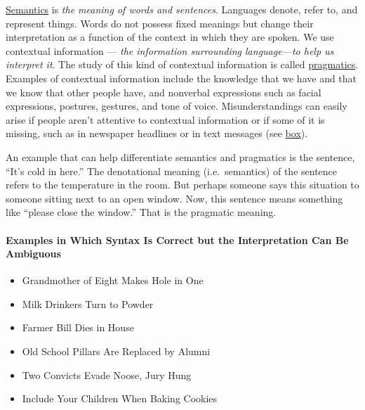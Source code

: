 \documentclass[
]{krantz}
\providecommand{\tightlist}{%
  \setlength{\itemsep}{0pt}\setlength{\parskip}{0pt}}
\begin{document}
\protect\hyperlink{semantics}{Semantics} is \emph{the meaning of words and sentences}. Languages denote, refer to, and represent things. Words do not possess fixed meanings but change their interpretation as a function of the context in which they are spoken. We use contextual information --- \emph{the information surrounding language---to help us interpret it}. The study of this kind of contextual information is called \protect\hyperlink{pragmatics}{pragmatics}. Examples of contextual information include the knowledge that we have and that we know that other people have, and nonverbal expressions such as facial expressions, postures, gestures, and tone of voice. Misunderstandings can easily arise if people aren't attentive to contextual information or if some of it is missing, such as in newspaper headlines or in text messages (see \protect\hyperlink{examples-in-which-syntax-is-correct-but-the-interpretation-can-be-ambiguous}{box}).

An example that can help differentiate semantics and pragmatics is the sentence, ``It's cold in here.'' The denotational meaning (i.e.~semantics) of the sentence refers to the temperature in the room. But perhaps someone says this situation to someone sitting next to an open window. Now, this sentence means something like ``please close the window.'' That is the pragmatic meaning.

\hypertarget{examples-in-which-syntax-is-correct-but-the-interpretation-can-be-ambiguous}{%
\paragraph*{Examples in Which Syntax Is Correct but the Interpretation Can Be Ambiguous}\label{examples-in-which-syntax-is-correct-but-the-interpretation-can-be-ambiguous}}

\begin{itemize}
\tightlist
\item
  Grandmother of Eight Makes Hole in One
\item
  Milk Drinkers Turn to Powder
\item
  Farmer Bill Dies in House
\item
  Old School Pillars Are Replaced by Alumni
\item
  Two Convicts Evade Noose, Jury Hung
\item
  Include Your Children When Baking Cookies
\end{itemize}
\end{document}
